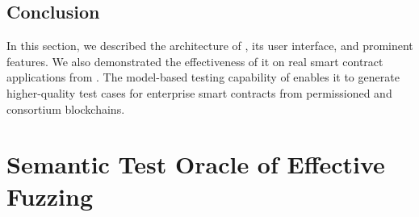 \subsection{Conclusion}
\label{sec:conclude}

In this section, we described the architecture of \modcon, its user interface, and prominent features.
We also demonstrated the effectiveness of it on real smart contract applications from \company.
The model-based testing capability of \modcon enables it to generate higher-quality test cases for
enterprise smart contracts from permissioned and consortium blockchains.

\section{Semantic Test Oracle of Effective Fuzzing}